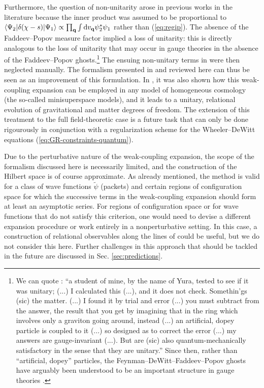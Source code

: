 \documentclass[12pt]{iopart}
\def\eref#1{(\ref{eq:#1})}
\def\D{\mathrm{d}}
\def\q{\mathbf{q}}
\begin{document}
Furthermore, the question of non-unitarity arose in previous works in the literature \citep{kiefer1991quantum,Brizuela:2015tzl,Brizuela:2016gnz,Brizuela:2019jzv} because the inner product was assumed to be proportional to $\braket{\Psi_2|\delta(\chi-s)|\Psi_1} \propto \prod_{\q}\int\D v_{\q}\psi^*_2\psi_1$ rather than \eref{regip}. The absence of the Faddeev--Popov measure factor implied a loss of unitarity: this is directly analogous to the loss of unitarity that may occur in gauge theories in the absence of the Faddeev--Popov ghosts.\footnote{We can quote \citet[pp. 848 (704), 849 (705) and 854 (710)]{Feynman:1963}: ``a student of mine, by the name of Yura, tested to see if it was unitary; (...) I calculated this (...), and it does not check. Somethin'gs (sic) the matter. (...) I found it by trial and error (...) you must subtract from the answer, the result that you get by imagining that in the ring which involves only a graviton going around, instead (...) an artificial, dopey particle is coupled to it (...) so designed as to correct the error (...) my answers are gauge-invariant (...). But are (sic) also quantum-mechanically satisfactory in the sense that they are unitary.'' Since then, rather than ``artificial, dopey'' particles, the Feynman--DeWitt--Faddeev--Popov ghosts have arguably been understood to be an important structure in gauge theories \citep{HT:book}.} The ensuing non-unitary terms in \citet{kiefer1991quantum,Brizuela:2015tzl,Brizuela:2016gnz,Brizuela:2019jzv} were then neglected manually. The formalism presented in \citet{Chataignier:2019psm,Chataig:Thesis,Chataignier:2020fap} and reviewed here can thus be seen as an improvement of this formulation. In \citet{Chataignier:2022iwb}, it was also shown how this weak-coupling expansion can be employed in any model of homogeneous cosmology (the so-called minisuperspace models), and it leads to a unitary, relational evolution of gravitational and matter degrees of freedom. The extension of this treatment to the full field-theoretic case is a future task that can only be done rigourously in conjunction with a regularization scheme for the Wheeler--DeWitt equations \eref{GR-constraints-quantum}.

Due to the perturbative nature of the weak-coupling expansion, the scope of the formalism discussed here is necessarily limited, and the construction of the Hilbert space is of course approximate. As already mentioned, the method is valid for a class of wave functions $\tilde{\psi}$ (packets) and certain regions of configuration space for which the successive terms in the weak-coupling expansion should form at least an asymptotic series. For regions of configuration space or for wave functions that do not satisfy this criterion, one would need to devise a different expansion procedure or work entirely in a nonperturbative setting. In this case, a construction of relational observables along the lines of \citet{Chataig:Thesis} could be useful, but we do not consider this here. Further challenges in this approach that should be tackled in the future are discussed in Sec. \ref{sec:predictions}.
\end{document}

